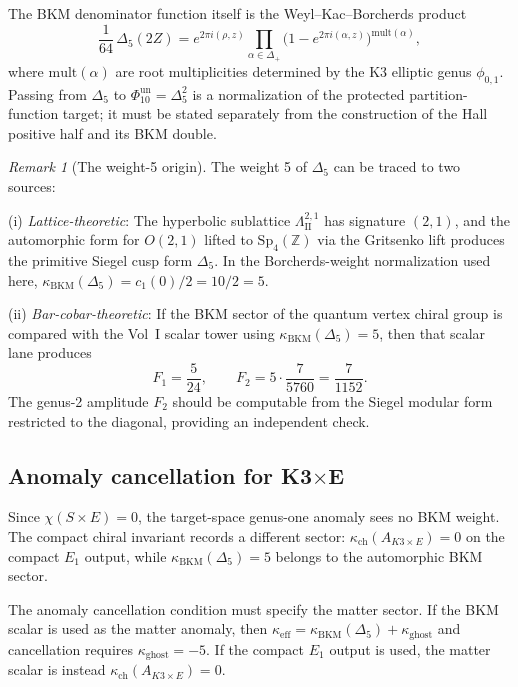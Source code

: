 \documentclass[11pt]{article}
\theoremstyle{definition}
\theoremstyle{remark}
\newtheorem{remark}[theorem]{Remark}
\begin{document}
The BKM denominator function itself is the Weyl--Kac--Borcherds product
\begin{equation}\label{eq:product-formula}
 \frac{1}{64}\,\Delta_5(2Z)
 = e^{2\pi i (\rho, z)}
 \prod_{\alpha \in \Delta_+}
 \bigl(1 - e^{2\pi i (\alpha, z)}\bigr)^{\mathrm{mult}(\alpha)},
\end{equation}
where $\mathrm{mult}(\alpha)$ are root multiplicities determined by the
K3 elliptic genus $\phi_{0,1}$. Passing from $\Delta_5$ to
$\Phi_{10}^{\mathrm{un}}=\Delta_5^2$ is a normalization of the protected
partition-function target; it must be stated separately from the
construction of the Hall positive half and its BKM double.

\begin{remark}[The weight-5 origin]
The weight 5 of $\Delta_5$ can be traced to two sources:

(i) \emph{Lattice-theoretic}: The hyperbolic sublattice
$\Lambda^{2,1}_{\mathrm{II}}$ has signature $(2,1)$, and the automorphic
form for $O(2,1)$ lifted to $\mathrm{Sp}_4(\mathbb{Z})$ via the Gritsenko
lift produces the primitive Siegel cusp form $\Delta_5$. In the
Borcherds-weight normalization used here,
$\kappa_{\mathrm{BKM}}(\Delta_5)=c_1(0)/2=10/2=5$.

(ii) \emph{Bar-cobar-theoretic}: If the BKM sector of the quantum vertex
chiral group is compared with the Vol~I scalar tower using
$\kappa_{\mathrm{BKM}}(\Delta_5)=5$, then that scalar lane
produces
\[
 F_1 = \frac{5}{24}, \qquad
 F_2 = 5 \cdot \frac{7}{5760} = \frac{7}{1152}.
\]
The genus-2 amplitude $F_2$ should be computable from the Siegel modular
form restricted to the diagonal, providing an independent check.
\end{remark}

\subsection{Anomaly cancellation for K3$\times$E}

Since $\chi(S \times E) = 0$, the target-space genus-one anomaly sees no
BKM weight. The compact chiral invariant records a different sector:
$\kappa_{\mathrm{ch}}(A_{K3\times E})=0$ on the compact $E_1$ output,
while $\kappa_{\mathrm{BKM}}(\Delta_5)=5$ belongs to the automorphic BKM
sector.

The anomaly cancellation condition must specify the matter sector. If the
BKM scalar is used as the matter anomaly, then
$\kappa_{\mathrm{eff}} =
\kappa_{\mathrm{BKM}}(\Delta_5)+\kappa_{\mathrm{ghost}}$ and cancellation
requires $\kappa_{\mathrm{ghost}}=-5$. If the compact $E_1$ output is used,
the matter scalar is instead $\kappa_{\mathrm{ch}}(A_{K3\times E})=0$.
\end{document}
